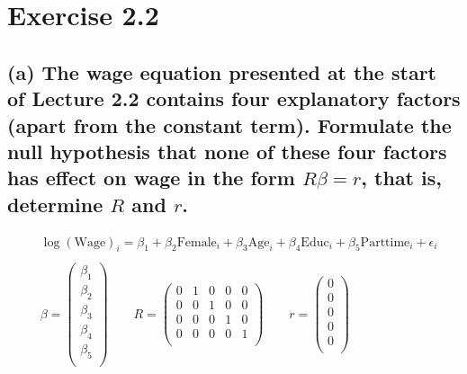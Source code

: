 \documentclass[12pt, a4paper]{article}
\begin{document}
\section*{Exercise 2.2}
\vspace{1em}

\subsection*{(a) The wage equation presented at the start of Lecture 2.2 contains four explanatory factors (apart from the constant term). Formulate the null hypothesis that none of these four factors has effect on wage in the form $R\beta = r$, that is, determine $R$ and $r$.}
\begin{align*}
    &\log(\text{Wage})_i = \beta_1 + \beta_2 \text{Female}_i + \beta_3 \text{Age}_i + \beta_4 \text{Educ}_i + \beta_5 \text{Parttime}_i + \epsilon_i\\\\
    &\beta = \left(\begin{array}{c}
        \beta_1\\
        \beta_2\\
        \beta_3\\
        \beta_4\\
        \beta_5\\
    \end{array}\right) \qquad
    R = \left(\begin{array}{ccccc}
        0 & 1 & 0 & 0 & 0\\
        0 & 0 & 1 & 0 & 0\\
        0 & 0 & 0 & 1 & 0\\
        0 & 0 & 0 & 0 & 1\\
    \end{array}\right) \qquad
    r = \left(\begin{array}{c}
        0\\0\\0\\0\\0\\
    \end{array}\right)
\end{align*}
\vspace{1em}
\end{document}
